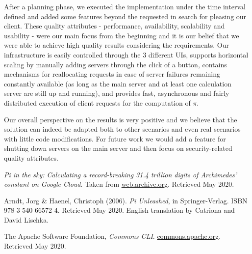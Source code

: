 \documentclass[12pt]{article}
\begin{document}
After a planning phase, we executed the implementation under the time interval defined and added some features beyond the requested in search for pleasing our client.
These quality attributes - performance, availability, scalability and usability - were our main focus from the beginning and it is our belief that we were able 
to achieve high quality results considering the requirements.
Our infrastructure is easily controlled through the 3 different UIs, supports horizontal scaling by manually adding servers through the click of a button, 
contains mechanisms for reallocating requests in case of server failures remaining constantly available (as long as the main server and at least one calculation 
server are still up and running), and provides fast, asynchronous and fairly distributed execution of client requests for the computation of $\pi$.

Our overall perspective on the results is very positive and we believe that the solution can indeed be adapted both to other scenarios and even real scenarios 
with little code modifications.
For future work we would add a feature for shutting down servers on the main server and then focus on security-related quality attributes.

\begin{thebibliography}{9} %
  

    \textit{Pi in the sky: Calculating a record-breaking 31.4 trillion digits of Archimedes' constant on Google Cloud}.
    Taken from \href{https://web.archive.org/web/20191019023120/https://cloud.google.com/blog/products/compute/calculating-31-4-trillion-digits-of-archimedes-constant-on-google-cloud}{web.archive.org}.
    Retrieved May 2020.

    Arndt, Jorg \& Haenel, Christoph (2006).
    \textit{Pi Unleashed}, in Springer-Verlag.
    ISBN 978-3-540-66572-4.
    Retrieved May 2020.
    English translation by Catriona and David Lischka.

    The Apache Software Foundation,
    \textit{Commons CLI}.
    \href{https://commons.apache.org/proper/commons-cli/}{commons.apache.org}.
    Retrieved May 2020.


\end{thebibliography}

\clearpage
\end{document}
